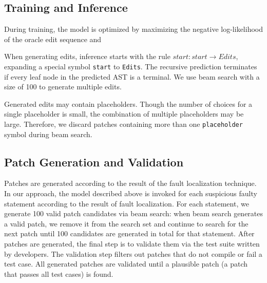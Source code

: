 \subsection{Training and Inference}
During training, the model is optimized by maximizing the negative log-likelihood of the oracle edit sequence and 

When generating edits, inference starts with the rule $start: \textit{start} \longrightarrow \textit{Edits}$, expanding a special symbol \texttt{start} to \texttt{Edits}. The recursive prediction terminates if every leaf node in the predicted AST is a terminal. We use beam search with a size of 100 to generate multiple edits. %

Generated edits may contain placeholders. Though the number of choices for a single placeholder is small, the combination of multiple placeholders may be large. Therefore, we discard patches containing more than one \texttt{placeholder} symbol during beam search.

\subsection{Patch Generation and Validation}
Patches are generated according to the result of the fault localization technique.
In our approach, the model described above is invoked for each suspicious faulty statement according to the result of fault localization. For each statement, we generate 100 valid patch candidates via beam search: when beam search generates a valid patch, we remove it from the search set and continue to search for the next patch until 100 candidates are generated in total for that statement. %
After patches are generated, the final step is to validate them via the test suite written by developers. The validation step filters out patches that do not compile or fail a test case. %
All generated patches are validated until a plausible patch (a patch that passes all test cases) is found.

